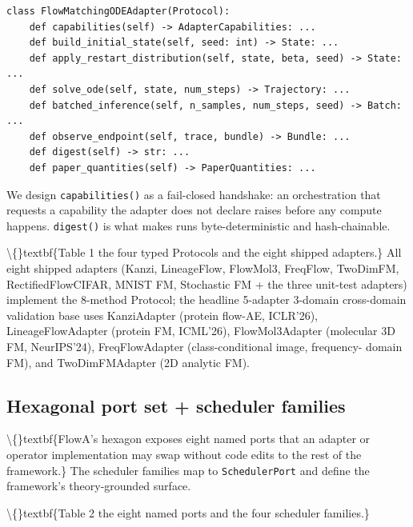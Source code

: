 \documentclass[preprint,3p,times,twocolumn]{elsarticle}
\begin{document}
\begin{verbatim}
class FlowMatchingODEAdapter(Protocol):
    def capabilities(self) -> AdapterCapabilities: ...
    def build_initial_state(self, seed: int) -> State: ...
    def apply_restart_distribution(self, state, beta, seed) -> State: ...
    def solve_ode(self, state, num_steps) -> Trajectory: ...
    def batched_inference(self, n_samples, num_steps, seed) -> Batch: ...
    def observe_endpoint(self, trace, bundle) -> Bundle: ...
    def digest(self) -> str: ...
    def paper_quantities(self) -> PaperQuantities: ...
\end{verbatim}
We design \texttt{capabilities()} as a fail-closed handshake: an orchestration that requests a capability the adapter does not declare raises before any compute happens. \texttt{digest()} is what makes runs byte-deterministic and hash-chainable.

\textbackslash\{\}textbf\{Table 1  the four typed Protocols and the eight shipped adapters.\} All eight shipped adapters (Kanzi, LineageFlow, FlowMol3, FreqFlow, TwoDimFM, RectifiedFlowCIFAR, MNIST FM, Stochastic FM + the three unit-test adapters) implement the 8-method Protocol; the headline 5-adapter  3-domain cross-domain validation base uses KanziAdapter (protein flow-AE, ICLR'26), LineageFlowAdapter (protein FM, ICML'26), FlowMol3Adapter (molecular 3D FM, NeurIPS'24), FreqFlowAdapter (class-conditional image, frequency- domain FM), and TwoDimFMAdapter (2D analytic FM).

\subsection{Hexagonal port set + scheduler families}
\textbackslash\{\}textbf\{FlowA's hexagon exposes eight named ports that an adapter or operator implementation may swap without code edits to the rest of the framework.\} The scheduler families map to \texttt{SchedulerPort} and define the framework's theory-grounded surface.

\textbackslash\{\}textbf\{Table 2  the eight named ports and the four scheduler families.\}
\end{document}
